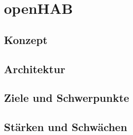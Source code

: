 \section{openHAB}
\subsection{Konzept}
\subsection{Architektur}
\subsection{Ziele und Schwerpunkte}
\subsection{Stärken und Schwächen}
